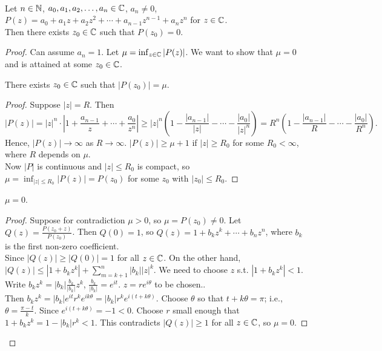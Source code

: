 \begin{thm}\\
	Let $n \in \mathbb{N}$, $a_{0},a_{1},a_{2},\ldots ,a_n \in \mathbb{C}$, $a_n\neq 0$,\\
	$P(z)=a_{0}+a_{1}z+a_{2}z^2+\cdots + a_{n-1}z^{n-1}+a_n z^{n}$ for $z \in \mathbb{C}$.\\
	Then there exists $z_{0} \in \mathbb{C}$ such that $P(z_{0})=0$.
	\begin{proof}
		Can assume $a_n=1$. Let $\mu=\inf_{z \in \mathbb{C}}\left|P(z)\right|$.
		We want to show that $\mu=0$ and is attained at some $z_{0} \in \mathbb{C}$.
		\begin{claim}[1]
			There exists $z_{0} \in \mathbb{C}$ such that $\left|P(z_{0})\right|=\mu$.
			\begin{proof}
				Suppose $\left|z\right|=R$. Then
				\[
					\left|P(z)\right|= \left|z\right|^{n} \cdot \left|1+ \frac{a_{n-1}}{z}+ \cdots + \frac{a_{0}}{z^{n}}\right|\ge \left|z\right|^{n} \left(1- \frac{\left|a_{n-1}\right|}{\left|z\right|}- \cdots - \frac{\left|a_0\right|}{\left|z\right|^{n}}\right)=R^{n}\left(1- \frac{\left|a_{n-1}\right|}{R}- \cdots - \frac{\left|a_0\right|}{R^{n}}\right)
					.\]
				Hence, $\left|P(z)\right|\to \infty$ as $R\to \infty$.
				$\left|P(z)\right|\ge \mu+1$ if $\left|z\right|\ge R_{0}$ for some $R_{0}<\infty$, where $R$ depends on $\mu$.\\
				Now $\left|P\right|$ is continuous and $\left|z\right|\le R_{0}$ is compact, so $\mu=\inf_{\left|z\right|\le R_{0}}\left|P(z)\right|=P(z_{0})$ for some $z_{0}$ with $\left|z_{0}\right|\le R_{0}$.
			\end{proof}
		\end{claim}
		\begin{claim}[2]
			$\mu=0$.
			\begin{proof}
				Suppose for contradiction $\mu>0$, so $\mu=P(z_{0})\neq 0$. Let $Q(z)= \frac{P(z_{0}+z)}{P(z_{0})}$. Then $Q(0)=1$, so $Q(z)=1+b_{k}z^{k}+ \cdots + b_n z^{n}$, where $b_k$ is the first non-zero coefficient.\\
				Since $\left|Q(z)\right|\ge \left|Q(0)\right|=1$ for all $z \in \mathbb{C}$.
				On the other hand, $\left|Q(z)\right|\le \left|1+b_k z^{k}\right|+ \sum_{m=k+1}^{n}{\left|b_k\right| \left|z\right|^{k}}$.
				We need to choose $z$ s.t. $\left|1+b_kz^{k}\right|<1$.\\
				Write $b_{k}z^{k}=\left|b_k\right| \frac{b_k}{\left|b_k\right|}z^{k}$, $\frac{b_k}{\left|b_k\right|}=e^{it}$. $z=re^{i\theta}$ to be chosen..\\
				Then $b_k z^{k}=\left|b_k\right|e^{it}r^{k}e^{ik \theta}=\left|b_k\right|r^{k} e^{i(t+k \theta)}$. Choose $\theta$ so that $t+k\theta=\pi$; i.e., $\theta=\frac{\pi-t}{k}$.
				Since $e^{i(t+k \theta)}=-1<0$.
				Choose $r$ small enough that $1+b_k z^{k}=1- \left|b_k\right|r^{k}<1$.
				This contradicts $\left|Q(z)\right|\ge 1$ for all $z \in \mathbb{C}$, so $\mu=0$.
			\end{proof}
		\end{claim}
	\end{proof}
\end{thm}


